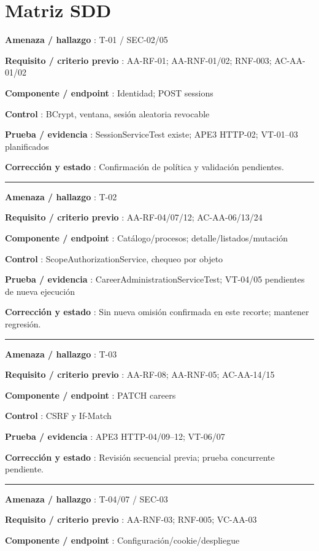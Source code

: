 \documentclass[12pt,a4paper]{report}
\begin{document}
\section{Matriz SDD}\label{AA4-semana-4-anexo1-matriz-sdd}

\textbf{Amenaza / hallazgo }: T-01 / SEC-02/05

\textbf{Requisito / criterio previo }: AA-RF-01; AA-RNF-01/02; RNF-003;
AC-AA-01/02

\textbf{Componente / endpoint }: Identidad; POST sessions

\textbf{Control }: BCrypt, ventana, sesión aleatoria revocable

\textbf{Prueba / evidencia }: SessionServiceTest existe; APE3 HTTP-02;
VT-01--03 planificados

\textbf{Corrección y estado }: Confirmación de política y validación
pendientes.

\medskip\hrule\medskip

\textbf{Amenaza / hallazgo }: T-02

\textbf{Requisito / criterio previo }: AA-RF-04/07/12; AC-AA-06/13/24

\textbf{Componente / endpoint }: Catálogo/procesos;
detalle/listados/mutación

\textbf{Control }: ScopeAuthorizationService, chequeo por objeto

\textbf{Prueba / evidencia }: CareerAdministrationServiceTest; VT-04/05
pendientes de nueva ejecución

\textbf{Corrección y estado }: Sin nueva omisión confirmada en este
recorte; mantener regresión.

\medskip\hrule\medskip

\textbf{Amenaza / hallazgo }: T-03

\textbf{Requisito / criterio previo }: AA-RF-08; AA-RNF-05; AC-AA-14/15

\textbf{Componente / endpoint }: PATCH careers

\textbf{Control }: CSRF y If-Match

\textbf{Prueba / evidencia }: APE3 HTTP-04/09--12; VT-06/07

\textbf{Corrección y estado }: Revisión secuencial previa; prueba
concurrente pendiente.

\medskip\hrule\medskip

\textbf{Amenaza / hallazgo }: T-04/07 / SEC-03

\textbf{Requisito / criterio previo }: AA-RNF-03; RNF-005; VC-AA-03

\textbf{Componente / endpoint }: Configuración/cookie/despliegue
\end{document}
